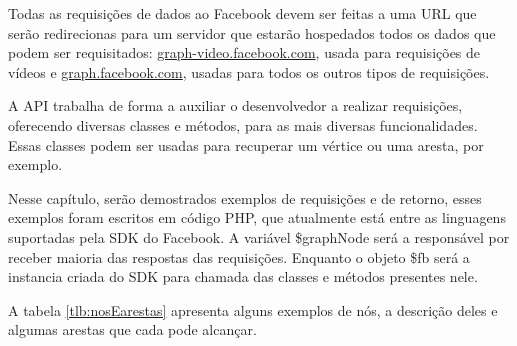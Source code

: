 Todas as requisições de dados ao Facebook devem ser feitas a uma URL que serão redirecionas para um servidor que estarão hospedados todos os dados que podem ser requisitados: \url{graph-video.facebook.com}, usada para requisições de vídeos e \url{graph.facebook.com}, usadas para todos os outros tipos de requisições.

A API trabalha de forma a auxiliar o desenvolvedor a realizar requisições, oferecendo diversas classes e métodos, para as mais diversas funcionalidades. Essas classes podem ser usadas para recuperar um vértice ou uma aresta, por exemplo.

Nesse capítulo, serão demostrados exemplos de requisições e de retorno, esses exemplos foram escritos em código PHP, que atualmente está entre as linguagens suportadas pela SDK do Facebook. A variável \$graphNode será a responsável por receber maioria das respostas das requisições. Enquanto o objeto \$fb será a instancia criada do SDK para chamada das classes e métodos presentes nele. 

A tabela \ref{tlb:nosEarestas} apresenta alguns exemplos de nós, a descrição deles e algumas arestas que cada pode alcançar.

